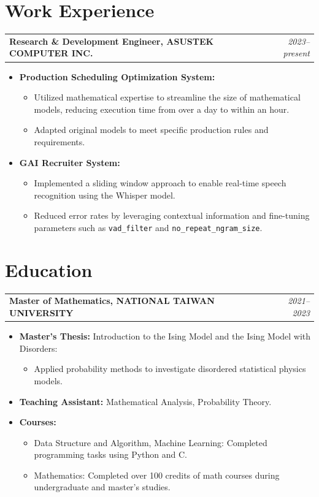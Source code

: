 \documentclass[a4paper,10pt]{article}
\begin{document}
\section*{Work Experience}
\begin{tabularx}{\textwidth}{Xr}
    \textbf{Research \& Development Engineer, ASUSTEK COMPUTER INC.} & \textit{2023--present} \\
\end{tabularx}
\begin{itemize}[leftmargin=30pt]
    \item \textbf{Production Scheduling Optimization System:}
    \begin{itemize}
        \item Utilized mathematical expertise to streamline the size of mathematical models, reducing execution time from over a day to within an hour.
        \item Adapted original models to meet specific production rules and requirements.
    \end{itemize}
    \item \textbf{GAI Recruiter System:}
    \begin{itemize}
        \item Implemented a sliding window approach to enable real-time speech recognition using the Whisper model.
        \item Reduced error rates by leveraging contextual information and fine-tuning parameters such as \texttt{vad\_filter} and \texttt{no\_repeat\_ngram\_size}.
    \end{itemize}
\end{itemize}

\section*{Education}
\begin{tabularx}{\textwidth}{Xr}
    \textbf{Master of Mathematics, NATIONAL TAIWAN UNIVERSITY} & \textit{2021--2023} \\
\end{tabularx}
\begin{itemize}[leftmargin=30pt]
    \item \textbf{Master's Thesis:} Introduction to the Ising Model and the Ising Model with Disorders:
    \begin{itemize}
        \item Applied probability methods to investigate disordered statistical physics models.
    \end{itemize}
    \item \textbf{Teaching Assistant:} Mathematical Analysis, Probability Theory.
    \item \textbf{Courses:}
    \begin{itemize}
        \item Data Structure and Algorithm, Machine Learning: Completed programming tasks using Python and C.
        \item Mathematics: Completed over 100 credits of math courses during undergraduate and master's studies.
    \end{itemize}
\end{itemize}
\end{document}
